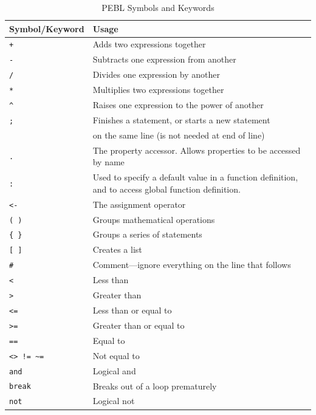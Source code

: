 \begin{table}[htbp]
\flushleft
\caption{PEBL Symbols and Keywords}
\begin{tabular}{ll}
\toprule
\textbf{Symbol/Keyword}& \textbf{Usage}\\
\midrule
\verb-+-  &                  Adds two expressions together\\
\verb+-+  &                  Subtracts one expression from another\\
\verb+/+  &                  Divides one expression by another\\
\verb+*+  &                  Multiplies two expressions together\\
\verb+^+  &                  Raises one expression  to the power of another\\
\verb+;+  &                  Finishes a statement, or starts a new statement\\              &                  
on the same line (is not needed at end of line)\\
\verb+.+ &                   The property accessor.  Allows properties
to be accessed by name\\
\verb+:+&                    Used to specify a default value in a function definition, and to access global function definition.\\
\verb+<-+  &                 The assignment operator\\
\verb+( )+ &                 Groups mathematical operations\\
\verb+{ }+ &                 Groups a series of statements\\
\verb+[ ]+ &                 Creates a list\\
\verb+#+   &                 Comment---ignore everything on the line that follows\\
\verb+<+   &                 Less than\\
\verb+>+   &                 Greater than\\
\verb+<=+  &                 Less than or equal to\\
\verb+>=+  &                 Greater than or equal to\\
\verb+==+  &                 Equal to\\
\verb+<> != ~=+&             Not equal to\\
\texttt{and}   &               Logical and\\
\texttt{break} &               Breaks out of a loop prematurely\\
\texttt{not}   &               Logical not\\

\end{tabular}
\end{table}
